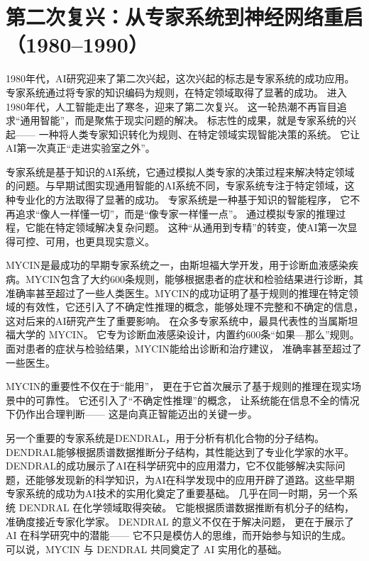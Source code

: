 \section{第二次复兴：从专家系统到神经网络重启（1980–1990）}

1980年代，AI研究迎来了第二次兴起，这次兴起的标志是专家系统的成功应用。专家系统通过将专家的知识编码为规则，在特定领域取得了显著的成功。
进入1980年代，人工智能走出了寒冬，迎来了第二次复兴。  
这一轮热潮不再盲目追求“通用智能”，而是聚焦于现实问题的解决。  
标志性的成果，就是专家系统的兴起——  
一种将人类专家知识转化为规则、在特定领域实现智能决策的系统。  
它让AI第一次真正“走进实验室之外”。  

专家系统是基于知识的AI系统，它通过模拟人类专家的决策过程来解决特定领域的问题。与早期试图实现通用智能的AI系统不同，专家系统专注于特定领域，这种专业化的方法取得了显著的成功。
专家系统是一种基于知识的智能程序，  
它不再追求“像人一样懂一切”，而是“像专家一样懂一点”。  
通过模拟专家的推理过程，它能在特定领域解决复杂问题。  
这种“从通用到专精”的转变，使AI第一次显得可控、可用，也更具现实意义。  

MYCIN是最成功的早期专家系统之一，由斯坦福大学开发，用于诊断血液感染疾病。MYCIN包含了大约600条规则，能够根据患者的症状和检验结果进行诊断，其准确率甚至超过了一些人类医生。MYCIN的成功证明了基于规则的推理在特定领域的有效性，它还引入了不确定性推理的概念，能够处理不完整和不确定的信息，这对后来的AI研究产生了重要影响。
在众多专家系统中，最具代表性的当属斯坦福大学的 MYCIN。  
它专为诊断血液感染设计，内置约600条“如果—那么”规则。  
面对患者的症状与检验结果，MYCIN能给出诊断和治疗建议，  
准确率甚至超过了一些医生。  

MYCIN的重要性不仅在于“能用”，  
更在于它首次展示了基于规则的推理在现实场景中的可靠性。  
它还引入了“不确定性推理”的概念，  
让系统能在信息不全的情况下仍作出合理判断——  
这是向真正智能迈出的关键一步。  

另一个重要的专家系统是DENDRAL，用于分析有机化合物的分子结构。DENDRAL能够根据质谱数据推断分子结构，其性能达到了专业化学家的水平。DENDRAL的成功展示了AI在科学研究中的应用潜力，它不仅能够解决实际问题，还能够发现新的科学知识，为AI在科学发现中的应用开辟了道路。这些早期专家系统的成功为AI技术的实用化奠定了重要基础。
几乎在同一时期，另一个系统 DENDRAL 在化学领域取得突破。  
它能根据质谱数据推断有机分子的结构，准确度接近专家化学家。  
DENDRAL 的意义不仅在于解决问题，  
更在于展示了 AI 在科学研究中的潜能——  
它不只是模仿人的思维，而开始参与知识的生成。  
可以说，MYCIN 与 DENDRAL 共同奠定了 AI 实用化的基础。  

